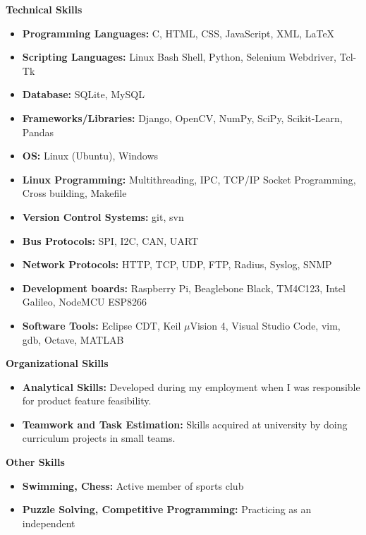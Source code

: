 \documentclass[letterpaper,10pt]{article}
\newcommand{\resheading}[1]{{\large \colorbox{mygrey}{\begin{minipage}{\textwidth}{\textbf{#1 \vphantom{p\^{E}}}}\end{minipage}}}}
\begin{document}
\resheading{Technical Skills}
\begin{itemize}
\item \textbf{Programming Languages:} C, HTML, CSS, JavaScript, XML, LaTeX
\item \textbf{Scripting Languages:} Linux Bash Shell, Python, Selenium Webdriver, Tcl-Tk
\item \textbf{Database:} SQLite, MySQL
\item \textbf{Frameworks/Libraries:} Django, OpenCV, NumPy, SciPy, Scikit-Learn, Pandas 
\item \textbf{OS:} Linux (Ubuntu), Windows
\item \textbf{Linux Programming:} Multithreading, IPC, TCP/IP Socket Programming, Cross building, Makefile
\item \textbf{Version Control Systems:} git, svn
\item \textbf{Bus Protocols:} SPI, I2C, CAN, UART
\item \textbf{Network Protocols:} HTTP, TCP, UDP, FTP, Radius, Syslog, SNMP
\item \textbf{Development boards:} Raspberry Pi, Beaglebone Black, TM4C123, Intel Galileo, NodeMCU ESP8266
\item \textbf{Software Tools:} Eclipse CDT, Keil $\mu$Vision 4, Visual Studio Code, vim, gdb, Octave, MATLAB

\end{itemize}

\resheading{Organizational Skills}
\begin{itemize}
\item \textbf{Analytical Skills:} Developed during my employment when I was responsible for product feature feasibility.
\item \textbf{Teamwork and Task Estimation:} Skills acquired at university by doing curriculum projects in small teams.

\end{itemize}

\resheading{Other Skills}
    \begin{itemize}
        \item \textbf{Swimming, Chess:} Active member of sports club
        \item \textbf{Puzzle Solving, Competitive Programming:} Practicing as an independent
    \end{itemize}
\end{document}
